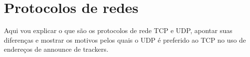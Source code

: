 
\section{Protocolos de redes}

Aqui vou explicar o que são os protocolos de rede TCP e UDP, apontar suas diferenças e
mostrar os motivos pelos quais o UDP é preferido ao TCP no uso de endereços de
\gls*{announce} de \glspl*{tracker}.